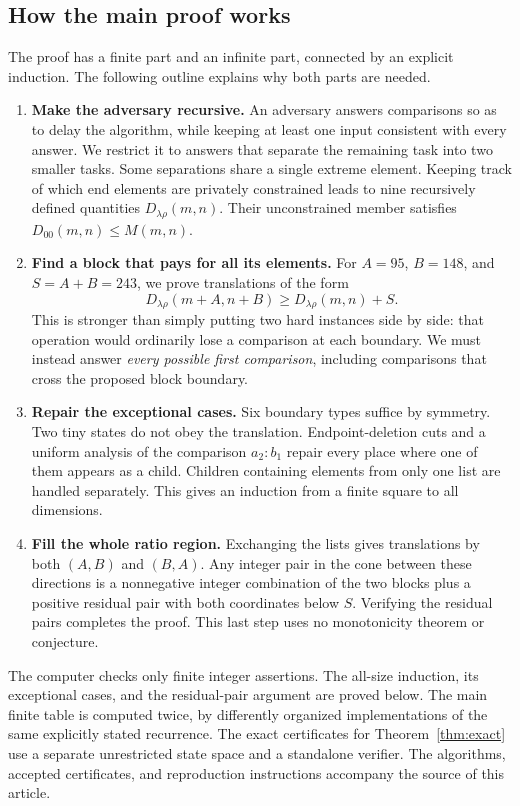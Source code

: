 \documentclass[11pt]{article}
\theoremstyle{definition}
\theoremstyle{remark}
\begin{document}
\subsection{How the main proof works}
The proof has a finite part and an infinite part, connected by an explicit
induction. The following outline explains why both parts are needed.
\begin{enumerate}
\item \textbf{Make the adversary recursive.}
An adversary answers comparisons so as to delay the algorithm, while keeping
at least one input consistent with every answer. We restrict it to answers
that separate the remaining task into two smaller tasks. Some separations
share a single extreme element. Keeping track of which end elements are
privately constrained leads to nine recursively defined quantities
$D_{\lambda\rho}(m,n)$. Their unconstrained member satisfies
$D_{00}(m,n)\le M(m,n)$.
\item \textbf{Find a block that pays for all its elements.}
For $A=95$, $B=148$, and $S=A+B=243$, we prove translations of the form
\[
 D_{\lambda\rho}(m+A,n+B)
 \ge D_{\lambda\rho}(m,n)+S.
\]
This is stronger than simply putting two hard instances side by side:
that operation would ordinarily lose a comparison at each boundary.
We must instead answer \emph{every possible first comparison}, including
comparisons that cross the proposed block boundary.
\item \textbf{Repair the exceptional cases.}
Six boundary types suffice by symmetry. Two tiny states do not obey the
translation. Endpoint-deletion cuts and a uniform analysis of the comparison
$a_2:b_1$ repair every place where one of them appears as a child. Children containing elements
from only one list are handled separately. This gives an induction from a
finite square to all dimensions.
\item \textbf{Fill the whole ratio region.}
Exchanging the lists gives translations by both $(A,B)$ and $(B,A)$.
Any integer pair in the cone between these directions is a nonnegative
integer combination of the two blocks plus a positive residual pair with
both coordinates below $S$. Verifying the residual pairs completes the
proof. This last step uses no monotonicity theorem or conjecture.
\end{enumerate}

The computer checks only finite integer assertions. The all-size induction,
its exceptional cases, and the residual-pair argument are proved below.
The main finite table is computed twice, by differently organized
implementations of the same explicitly stated recurrence. The exact
certificates for Theorem~\ref{thm:exact} use a separate unrestricted
state space and a standalone verifier. The algorithms, accepted certificates,
and reproduction instructions accompany the source of this article.
\end{document}
